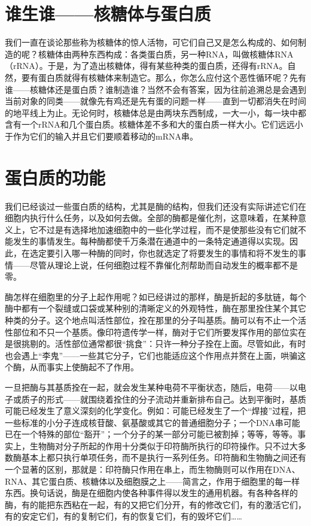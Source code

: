\section{谁生谁——核糖体与蛋白质}

我们一直在谈论那些称为核糖体的惊人活物，可它们自己又是怎么构成的、如何制造的呢？核糖体由两种东西构成：各类蛋白质，另一种RNA，叫做核糖体RNA（rRNA）。于是，为了造出核糖体，得有某些种类的蛋白质，还得有rRNA。自然，要有蛋白质就得有核糖体来制造它。那么，你怎么应付这个恶性循环呢？先有谁——核糖体还是蛋白质？谁制造谁？当然不会有答案，因为往前追溯总是会遇到当前对象的同类——就像先有鸡还是先有蛋的问题一样——直到一切都消失在时间的地平线上为止。无论何时，核糖体总是由两块东西制成，一大一小，每一块中都含有一个rRNA和几个蛋白质。核糖体差不多和大的蛋白质一样大小。它们远远小于作为它们的输入并且它们要顺着移动的mRNA串。

\section{蛋白质的功能}

我们已经谈过一些蛋白质的结构，尤其是酶的结构，但我们还没有实际讲述它们在细胞内执行什么任务，以及如何去做。全部的酶都是催化剂，这意味着，在某种意义上，它不过是有选择地加速细胞中的一些化学过程，而不是使那些没有它们就不能发生的事情发生。每种酶都使千万条潜在通道中的一条特定通道得以实现。因此，在选定要引入哪一种酶的同时，你也就选定了将要发生的事情和将不发生的事情——尽管从理论上说，任何细胞过程不靠催化剂帮助而自动发生的概率都不是零。

酶怎样在细胞里的分子上起作用呢？如已经讲过的那样，酶是折起的多肽链，每个酶中都有一个裂缝或口袋或某种别的清晰定义的外观特性，酶在那里拴住某个其它种类的分子。这个地点叫活性部位，拴在那里的分子叫基质。酶可以有不止一个活性部位和不只一个基质。像印符遗传学一样，酶对于它们所要发挥作用的部位实在是很挑剔的。活性部位通常都很“挑食”：只许一种分子拴在上面。尽管如此，有时也会遇上“李鬼”——一些其它分子，它们也能适应这个作用点并赘在上面，哄骗这个酶，从而事实上使酶起不了作用。

一旦把酶与其基质拴在一起，就会发生某种电荷不平衡状态，随后，电荷——以电子或质子的形式——就围绕着拴住的分子流动并重新排布自己。达到平衡时，基质可能已经发生了意义深刻的化学变化。例如：可能已经发生了一个“焊接”过程，把一些标准的小分子连成核苷酸、氨基酸或其它的普通细胞分子；一个DNA串可能已在一个特殊的部位“豁开”；一个分子的某一部分可能已被割掉；等等，等等。事实上，生物酶对分子所起的作用十分类似于印符酶所执行的印符操作。只不过大多数酶基本上都只执行单项任务，而不是执行一系列任务。印符酶和生物酶之间还有一个显著的区别，那就是：印符酶只作用在串上，而生物酶则可以作用在DNA、RNA、其它蛋白质、核糖体以及细胞膜之上——简言之，作用于细胞里的每一样东西。换句话说，酶是在细胞内使各种事件得以发生的通用机器。有各种各样的酶，有的能把东西粘在一起，有的又把它们分开，有的修改它们，有的激活它们，有的安定它们，有的复制它们，有的恢复它们，有的毁坏它们……

